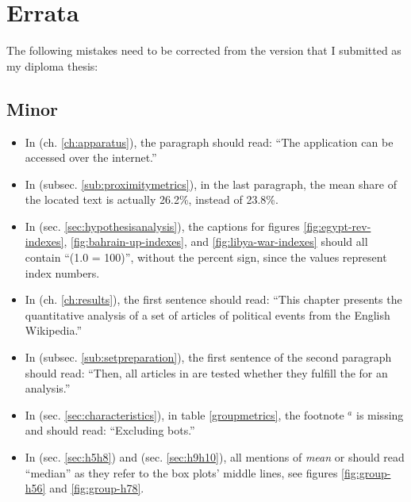 \chapter{Errata}

The following mistakes need to be corrected from the version that I submitted as my diploma thesis:

\section{Minor}

\begin{itemize}
  \item In  (ch. \ref{ch:apparatus}), the  paragraph should read: ``The application can be accessed over the internet.''
  \item In  (subsec. \ref{sub:proximitymetrics}), in the last paragraph, the mean share of the located text is actually 26.2\%, instead of 23.8\%.
  \item In  (sec. \ref{sec:hypothesisanalysis}), the captions for figures \ref{fig:egypt-rev-indexes}, \ref{fig:bahrain-up-indexes}, and \ref{fig:libya-war-indexes} should all contain ``(1.0 = 100)'', without the percent sign, since the values represent index numbers.
  \item In  (ch. \ref{ch:results}), the first sentence should read: ``This chapter presents the quantitative analysis of a set of articles of political events from the English Wikipedia.''
  \item In  (subsec. \ref{sub:setpreparation}), the first sentence of the second paragraph should read: ``Then, all articles in  are tested whether they fulfill the  for an analysis.''
  \item In  (sec. \ref{sec:characteristics}), in table \ref{groupmetrics}, the footnote $^{a}$ is missing and should read: ``Excluding bots.''
  \item In  (sec. \ref{sec:h5h8}) and  (sec. \ref{sec:h9h10}), all mentions of \emph{mean} or  should read ``median'' as they refer to the box plots' middle lines, see figures \ref{fig:group-h56} and \ref{fig:group-h78}.
\end{itemize}


